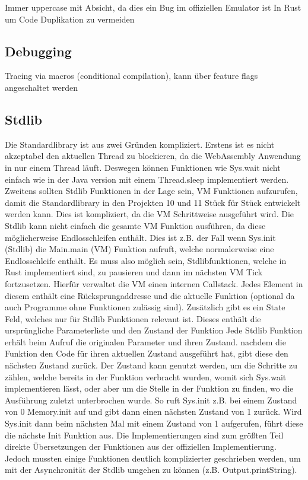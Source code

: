 Immer uppercase mit Absicht, da dies ein Bug im offiziellen Emulator ist
In Rust um Code Duplikation zu vermeiden

\subsection{Debugging}
Tracing via macros (conditional compilation), kann über feature flags angeschaltet werden

\subsection{Stdlib}
Die Standardlibrary ist aus zwei Gründen kompliziert. Erstens ist es nicht akzeptabel den aktuellen Thread zu blockieren, da die WebAssembly Anwendung in nur einem Thread läuft. Deswegen können Funktionen wie Sys.wait nicht einfach wie in der Java version mit einem Thread.sleep implementiert werden.
Zweitens sollten Stdlib Funktionen in der Lage sein, VM Funktionen aufzurufen, damit die Standardlibrary in den Projekten 10 und 11 Stück für Stück entwickelt werden kann. Dies ist kompliziert, da die VM Schrittweise ausgeführt wird. Die Stdlib kann nicht einfach die gesamte VM Funktion ausführen, da diese möglicherweise Endlosschleifen enthält. Dies ist z.B. der Fall wenn Sys.init (Stdlib) die Main.main (VM) Funktion aufruft, welche normalerweise eine Endlosschleife enthält.
Es muss also möglich sein, Stdlibfunktionen, welche in Rust implementiert sind, zu pausieren und dann im nächsten VM Tick fortzusetzen.
Hierfür verwaltet die VM einen internen Callstack. Jedes Element in diesem enthält eine Rücksprungaddresse und die aktuelle Funktion (optional da auch Programme ohne Funktionen zulässig sind).
Zusätzlich gibt es ein State Feld, welches nur für Stdlib Funktionen relevant ist. Dieses enthält die ursprüngliche Parameterliste und den Zustand der Funktion
Jede Stdlib Funktion erhält beim Aufruf die originalen Parameter und ihren Zustand.
nachdem die Funktion den Code für ihren aktuellen Zustand ausgeführt hat, gibt diese den nächsten Zustand zurück.
Der Zustand kann genutzt werden, um die Schritte zu zählen, welche bereits in der Funktion verbracht wurden, womit sich Sys.wait implementieren lässt, oder aber um die Stelle in der Funktion zu finden, wo die Ausführung zuletzt unterbrochen wurde. So ruft Sys.init z.B. bei einem Zustand von 0 Memory.init auf und gibt dann einen nächsten Zustand von 1 zurück. Wird Sys.init dann beim nächsten Mal mit einem Zustand von 1 aufgerufen, führt diese die nächste Init Funktion aus.
Die Implementierungen sind zum größten Teil direkte Übersetzungen der Funktionen aus der offiziellen Implementierung. Jedoch mussten einige Funktionen deutlich komplizierter geschrieben werden, um mit der Asynchronität der Stdlib umgehen zu können (z.B. Output.printString).
